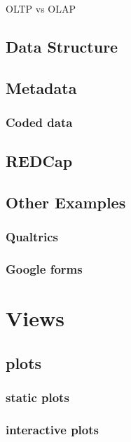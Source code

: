 \documentclass[
]{book}
\begin{document}
OLTP vs OLAP

\section{Data Structure}\label{data-structure}

\section{Metadata}\label{metadata}

\subsection{Coded data}\label{coded-data}

\section{REDCap}\label{redcap}

\section{Other Examples}\label{other-examples}

\subsection{Qualtrics}\label{qualtrics}

\subsection{Google forms}\label{google-forms}

\chapter{Views}\label{views}

\section{plots}\label{plots}

\subsection{static plots}\label{static-plots}

\subsection{interactive plots}\label{interactive-plots}
\end{document}

